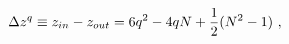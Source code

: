 \begin{equation}
\Delta z^q \equiv z_{in}-z_{out} 
           = 6q^2-4qN + {1\over 2}(N^2-1) \ , 
\label{Deltazq}
\end{equation}

